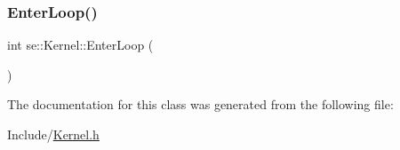 \mbox{\label{classse_1_1_kernel_a1faeac6fce02ccd7ff76d94ad78e0754}} 
\subsubsection{\texorpdfstring{Enter\+Loop()}{EnterLoop()}}
{\footnotesize\ttfamily int se\+::\+Kernel\+::\+Enter\+Loop (\begin{DoxyParamCaption}{ }\end{DoxyParamCaption})}



The documentation for this class was generated from the following file\+:\begin{DoxyCompactItemize}
\item 
Include/\mbox{\hyperlink{_kernel_8h}{Kernel.\+h}}\end{DoxyCompactItemize}
